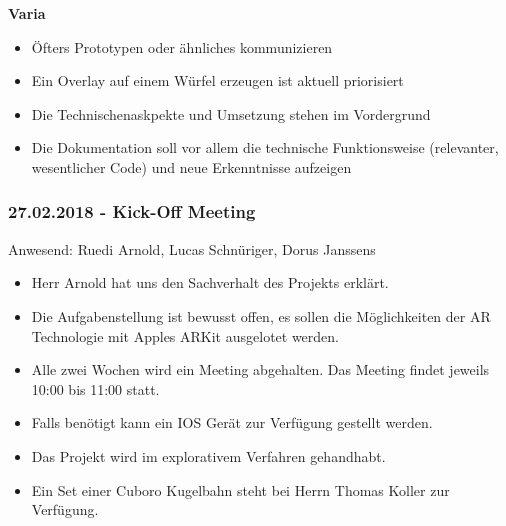 \textbf{Varia}
\begin{itemize}
	\item Öfters Prototypen oder ähnliches kommunizieren
	\item Ein Overlay auf einem Würfel erzeugen ist aktuell priorisiert
	\item Die Technischenaskpekte und Umsetzung stehen im Vordergrund
	\item Die Dokumentation soll vor allem die technische Funktionsweise (relevanter, wesentlicher Code) und neue Erkenntnisse aufzeigen
\end{itemize}

\subsubsection*{27.02.2018 - Kick-Off Meeting}

Anwesend: Ruedi Arnold, Lucas Schnüriger, Dorus Janssens

\begin{itemize}
	\item Herr Arnold hat uns den Sachverhalt des Projekts erklärt.
	\item Die Aufgabenstellung ist bewusst offen, es sollen die Möglichkeiten der AR Technologie mit Apples ARKit ausgelotet werden.
	\item Alle zwei Wochen wird ein Meeting abgehalten. Das Meeting findet jeweils 10:00 bis 11:00 statt.
	\item Falls benötigt kann ein IOS Gerät zur Verfügung gestellt werden.
	\item Das Projekt wird im explorativem Verfahren gehandhabt.
	\item Ein Set einer Cuboro Kugelbahn steht bei Herrn Thomas Koller zur Verfügung.
\end{itemize}

